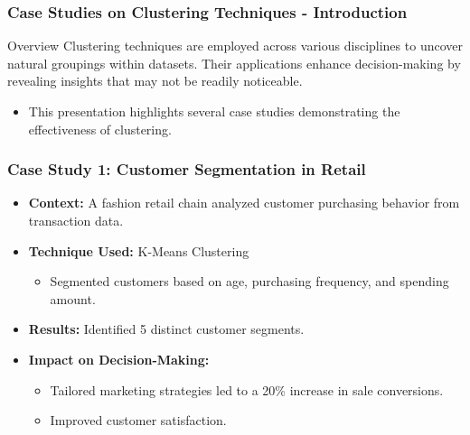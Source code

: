 \documentclass[aspectratio=169]{beamer}
\begin{document}
\begin{frame}[fragile]
    \frametitle{Case Studies on Clustering Techniques - Introduction}
    \begin{block}{Overview}
        Clustering techniques are employed across various disciplines to uncover natural groupings within datasets. 
        Their applications enhance decision-making by revealing insights that may not be readily noticeable.
    \end{block}
    \begin{itemize}
        \item This presentation highlights several case studies demonstrating the effectiveness of clustering.
    \end{itemize}
\end{frame}

\begin{frame}[fragile]
    \frametitle{Case Study 1: Customer Segmentation in Retail}
    \begin{itemize}
        \item \textbf{Context:} A fashion retail chain analyzed customer purchasing behavior from transaction data.
        \item \textbf{Technique Used:} K-Means Clustering
        \begin{itemize}
            \item Segmented customers based on age, purchasing frequency, and spending amount.
        \end{itemize}
        \item \textbf{Results:} Identified 5 distinct customer segments.
        \item \textbf{Impact on Decision-Making:}
        \begin{itemize}
            \item Tailored marketing strategies led to a 20\% increase in sale conversions.
            \item Improved customer satisfaction.
        \end{itemize}
    \end{itemize}
\end{frame}
\end{document}
